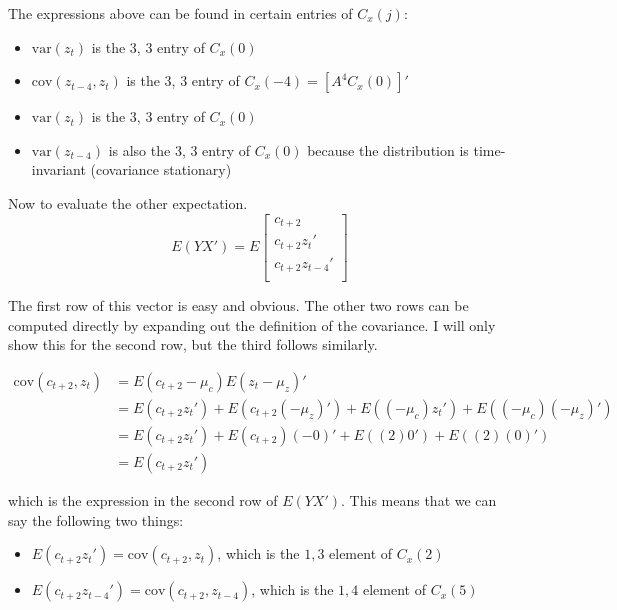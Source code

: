 \documentclass{homework}
\begin{document}
\begin{homeworkProblem}[Problem 2.6]
{\begin{enumerate}[a.]
      The expressions above can be found in certain entries of $C_x(j)$:

      \begin{itemize}
        \item $\text{var}(z_t)$ is the 3, 3 entry of $C_x(0)$
        \item $\text{cov}(z_{t-4}, z_t)$ is the 3, 3 entry of $C_x(-4) = \left[A^4 C_x(0)\right]'$
        \item $\text{var}(z_t)$ is the 3, 3 entry of $C_x(0)$
        \item $\text{var}(z_{t-4})$ is also the 3, 3 entry of $C_x(0)$ because the distribution is time-invariant (covariance stationary)
      \end{itemize}

      Now to evaluate the other expectation.
      $$
      E(YX') = E
      \begin{bmatrix}
       c_{t+2} \\
       c_{t+2} z_t' \\
       c_{t+2} z_{t-4}' \\
      \end{bmatrix}
      $$

      The first row of this vector is easy and obvious. The other two rows can be computed directly by expanding out the definition of the covariance. I will only show this for the second row, but the third follows similarly.

      \begin{align*}
        \text{cov}(c_{t+2}, z_t)  &= E(c_{t+2} - \mu_c) E(z_t - \mu_z)' \\
          &= E(c_{t+2} z_t') + E(c_{t+2}(-\mu_z)') + E((-\mu_c) z_t') + E((-\mu_c) (-\mu_z)') \\
          &= E(c_{t+2} z_t') + E(c_{t+2})(-0)' + E((2) 0') + E((2) (0)') \\
          &= E(c_{t+2} z_t')
      \end{align*}

      which is the expression in the second row of $E(YX')$. This means that we can say the following two things:

      \begin{itemize}
         \item $E(c_{t+2} z_t') = \text{cov}(c_{t+2}, z_t)$, which is the $1, 3$ element of $C_x(2)$
         \item $E(c_{t+2} z_{t-4}') = \text{cov}(c_{t+2}, z_{t-4})$, which is the $1, 4$ element of $C_x(5)$
       \end{itemize}


\end{enumerate}}
\end{homeworkProblem}
\end{document}
